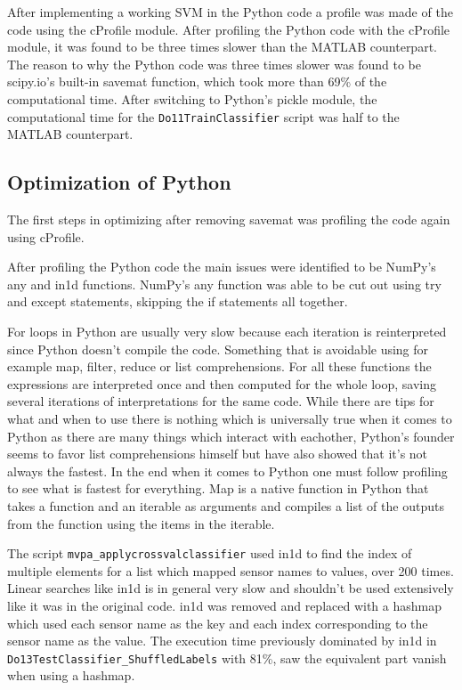 \documentclass[12pt, a4paper]{article}
\begin{document}
After implementing a working SVM in the Python code a profile was made of the code using the cProfile module.
After profiling the Python code with the cProfile module, it was found to be three times slower than the MATLAB counterpart.
The reason to why the Python code was three times slower was found to be scipy.io's built-in savemat function, which took more than 69\% of the computational time.
After switching to Python's pickle module, the computational time for the \texttt{Do11TrainClassifier} script was half to the MATLAB counterpart. %

\subsection{Optimization of Python}
The first steps in optimizing after removing savemat was profiling the code again using cProfile.

After profiling the Python code the main issues were identified to be NumPy's any and in1d functions.
NumPy's any function was able to be cut out using try and except statements, skipping the if statements all together.%

For loops in Python are usually very slow because each iteration is reinterpreted since Python doesn't compile the code.
Something that is avoidable using for example map, filter, reduce or list comprehensions. 
For all these functions the expressions are interpreted once and then computed for the whole loop, saving several iterations of interpretations for the same code. 
While there are tips for what and when to use there is nothing which is universally true when it comes to Python as there are many things which interact with eachother, Python's founder seems to favor list comprehensions himself but have also showed that it's not always the fastest.
In the end when it comes to Python one must follow profiling to see what is fastest for everything.
Map is a native function in Python that takes a function and an iterable as arguments and compiles a list of the outputs from the function using the items in the iterable.

The script \texttt{mvpa\_applycrossvalclassifier} used in1d to find the index of multiple elements for a list which mapped sensor names to values, over 200 times.
Linear searches like in1d is in general very slow and shouldn't be used extensively like it was in the original code.
in1d was removed and replaced with a hashmap which used each sensor name as the key and each index corresponding to the sensor name as the value.
The execution time previously dominated by in1d in \texttt{Do13TestClassifier\_ShuffledLabels} with 81\%, saw the equivalent part vanish when using a hashmap.
\end{document}
